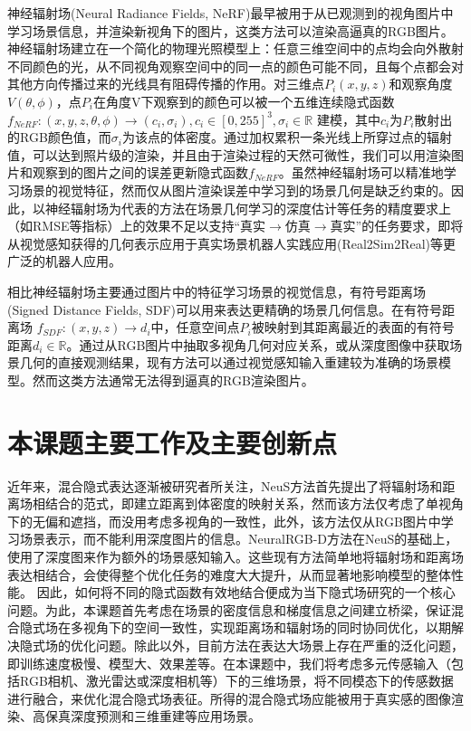 神经辐射场(Neural Radiance Fields, NeRF)\cite{mildenhall_nerf_2020}最早被用于从已观测到的视角图片中学习场景信息，并渲染新视角下的图片，这类方法可以渲染高逼真的RGB图片。神经辐射场建立在一个简化的物理光照模型上：任意三维空间中的点均会向外散射不同颜色的光，从不同视角观察空间中的同一点的颜色可能不同，且每个点都会对其他方向传播过来的光线具有阻碍传播的作用。对三维点$P_i (x,y,z)$和观察角度$V(\theta,\phi)$，点$P_i$在角度V下观察到的颜色可以被一个五维连续隐式函数$f_{NeRF}:(x,y,z,\theta,\phi)\to (c_i,\sigma_i),c_i\in[0,255]^3,\sigma_i\in \mathbb{R}$ 建模，其中$c_i$为$P_i$散射出的RGB颜色值，而$\sigma_i$为该点的体密度。通过加权累积一条光线上所穿过点的辐射值，可以达到照片级的渲染，并且由于渲染过程的天然可微性，我们可以用渲染图片和观察到的图片之间的误差更新隐式函数$f_{NeRF}$。虽然神经辐射场可以精准地学习场景的视觉特征，然而仅从图片渲染误差中学习到的场景几何是缺乏约束的。因此，以神经辐射场为代表的方法在场景几何学习的深度估计等任务的精度要求上（如RMSE等指标）上的效果不足以支持“真实$\rightarrow$仿真$\rightarrow$真实”的任务要求，即将从视觉感知获得的几何表示应用于真实场景机器人实践应用(Real2Sim2Real)等更广泛的机器人应用。

相比神经辐射场主要通过图片中的特征学习场景的视觉信息，有符号距离场(Signed Distance Fields, SDF)可以用来表达更精确的场景几何信息。在有符号距离场 $f_{SDF}:(x,y,z)→d_i$中，任意空间点$P_i$被映射到其距离最近的表面的有符号距离$d_i\in \mathbb{R}$。通过从RGB图片中抽取多视角几何对应关系，或从深度图像中获取场景几何的直接观测结果，现有方法可以通过视觉感知输入重建较为准确的场景模型。然而这类方法通常无法得到逼真的RGB渲染图片。

\section{本课题主要工作及主要创新点}

近年来，混合隐式表达逐渐被研究者所关注，NeuS\cite{wang_neus_2021}方法首先提出了将辐射场和距离场相结合的范式，即建立距离到体密度的映射关系，然而该方法仅考虑了单视角下的无偏和遮挡，而没用考虑多视角的一致性，此外，该方法仅从RGB图片中学习场景表示，而不能利用深度图片的信息。NeuralRGB-D\cite{azinovic_neural_2022}方法在NeuS的基础上，使用了深度图来作为额外的场景感知输入。这些现有方法简单地将辐射场和距离场表达相结合，会使得整个优化任务的难度大大提升，从而显著地影响模型的整体性能。 因此，如何将不同的隐式函数有效地结合便成为当下隐式场研究的一个核心问题。为此，本课题首先考虑在场景的密度信息和梯度信息之间建立桥梁，保证混合隐式场在多视角下的空间一致性，实现距离场和辐射场的同时协同优化，以期解决隐式场的优化问题。除此以外，目前方法在表达大场景上存在严重的泛化问题，即训练速度极慢、模型大、效果差等。在本课题中，我们将考虑多元传感输入（包括RGB相机、激光雷达或深度相机等）下的三维场景，将不同模态下的传感数据进行融合，来优化混合隐式场表征。所得的混合隐式场应能被用于真实感的图像渲染、高保真深度预测和三维重建等应用场景。


